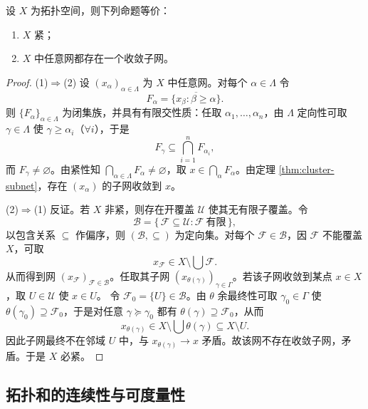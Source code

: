 \documentclass[lang=cn,a4paper,newtx,figureplace=section,tableplace=section]{elegantbook}
\begin{document}
\begin{theorem}[紧性的网刻画]\label{thm:compact-net}
  设 $X$ 为拓扑空间，则下列命题等价：
  \begin{enumerate}
    \item $X$ 紧；
    \item $X$ 中任意网都存在一个收敛子网。
  \end{enumerate}
\end{theorem}
\begin{proof}
  (1)$\Rightarrow$(2) 设 $(x_{\alpha})_{\alpha\in\Lambda}$ 为 $X$ 中任意网。对每个 $\alpha\in\Lambda$ 令
  \[
    F_{\alpha}=\overline{\{x_{\beta}:\beta\ge\alpha\}}.
  \]
  则 $\{F_{\alpha}\}_{\alpha\in\Lambda}$ 为闭集族，并具有有限交性质：任取 $\alpha_1,\dots,\alpha_n$，由 $\Lambda$ 定向性可取 $\gamma\in\Lambda$ 使 $\gamma\ge\alpha_i$（$\forall i$），于是
  \[
    F_{\gamma}\subseteq \bigcap_{i=1}^n F_{\alpha_i},
  \]
  而 $F_{\gamma}\neq\varnothing$。由紧性知 $\bigcap_{\alpha\in\Lambda}F_{\alpha}\neq\varnothing$，取 $x\in\bigcap_{\alpha}F_{\alpha}$。由定理 \ref{thm:cluster-subnet}，存在 $(x_{\alpha})$ 的子网收敛到 $x$。

  (2)$\Rightarrow$(1) 反证。若 $X$ 非紧，则存在开覆盖 $\mathcal U$ 使其无有限子覆盖。令
  \[
    \mathcal B=\{\,\mathcal F\subseteq\mathcal U: \mathcal F\ \text{有限}\,\},
  \]
  以包含关系 $\subseteq$ 作偏序，则 $(\mathcal B,\subseteq)$ 为定向集。对每个 $\mathcal F\in\mathcal B$，因 $\mathcal F$ 不能覆盖 $X$，可取
  \[
    x_{\mathcal F}\in X\setminus\bigcup\mathcal F.
  \]
  从而得到网 $(x_{\mathcal F})_{\mathcal F\in\mathcal B}$。任取其子网 $(x_{\theta(\gamma)})_{\gamma\in\Gamma}$。若该子网收敛到某点 $x\in X$，取 $U\in\mathcal U$ 使 $x\in U$。
  令 $\mathcal F_0=\{U\}\in\mathcal B$。由 $\theta$ 余最终性可取 $\gamma_0\in\Gamma$ 使 $\theta(\gamma_0)\supseteq\mathcal F_0$，于是对任意 $\gamma\succeq\gamma_0$ 都有 $\theta(\gamma)\supseteq\mathcal F_0$，从而
  \[
    x_{\theta(\gamma)}\in X\setminus\bigcup\theta(\gamma)\subseteq X\setminus U.
  \]
  因此子网最终不在邻域 $U$ 中，与 $x_{\theta(\gamma)}\to x$ 矛盾。故该网不存在收敛子网，矛盾。于是 $X$ 必紧。
\end{proof}

\subsection{拓扑和的连续性与可度量性}
\end{document}
